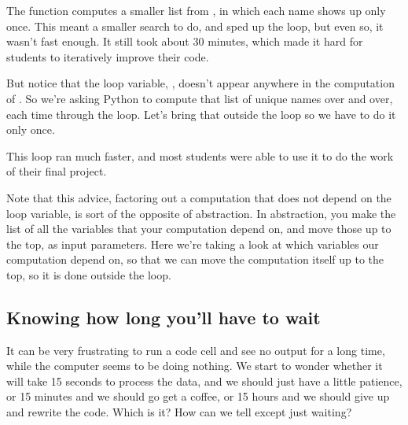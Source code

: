 \documentclass[letterpaper,10pt,english]{jupyterBook}
\begin{document}
\sphinxAtStartPar
The  function computes a smaller list from , in which each name shows up only once.  This meant a smaller search to do, and sped up the loop, but even so, it wasn’t fast enough.  It still took about 30 minutes, which made it hard for students to iteratively improve their code.

\sphinxAtStartPar
But notice that the loop variable, , doesn’t appear anywhere in the computation of .  So we’re asking Python to compute that list of unique names over and over, each time through the loop.  Let’s bring that outside the loop so we have to do it only once.

\begin{sphinxVerbatim}[commandchars=\\\{\}]
  \PYG{p}{[}\PYG{p}{]}
   \PYG{p}{[}\PYG{p}{]}
       
\end{sphinxVerbatim}

\sphinxAtStartPar
This loop ran much faster, and most students were able to use it to do the work of their final project.

\sphinxAtStartPar
Note that this advice, factoring out a computation that does not depend on the loop variable, is sort of the opposite of abstraction.  In abstraction, you make the list of all the variables that your computation  depend on, and move those up to the top, as input parameters.  Here we’re taking a look at which variables our computation  depend on, so that we can move the computation itself up to the top, so it is done outside the loop.


\subsection{Knowing how long you’ll have to wait}
\label{\detokenize{chapter-11-processing-rows:knowing-how-long-you-ll-have-to-wait}}
\sphinxAtStartPar
It can be very frustrating to run a code cell and see no output for a long time, while the computer seems to be doing nothing.  We start to wonder whether it will take 15 seconds to process the data, and we should just have a little patience, or 15 minutes and we should go get a coffee, or 15 hours and we should give up and rewrite the code.  Which is it?  How can we tell except just waiting?
\end{document}
